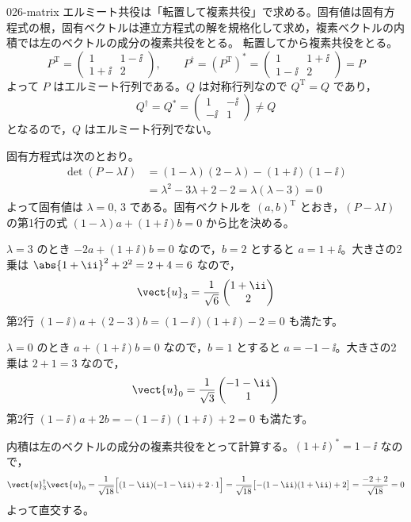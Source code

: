 \documentclass[uplatex,dvipdfmx,a4paper,11pt]{jsarticle}
\begin{document}
\kaitouhen
{}
\begin{kaisetsu}{026-matrix}
\houshin エルミート共役は「転置して複素共役」で求める。固有値は固有方程式の根，固有ベクトルは連立方程式の解を規格化して求め，複素ベクトルの内積では左のベクトルの成分の複素共役をとる。
\keisan {} 転置してから複素共役をとる。
\[ P^{\mathrm{T}}=\begin{pmatrix}1 & 1-\ii\\ 1+\ii & 2\end{pmatrix},\qquad P^{\dagger}=(P^{\mathrm{T}})^{*}=\begin{pmatrix}1 & 1+\ii\\ 1-\ii & 2\end{pmatrix}=P \]
よって $P$ はエルミート行列である。$Q$ は対称行列なので $Q^{\mathrm{T}}=Q$ であり，
\[ Q^{\dagger}=Q^{*}=\begin{pmatrix}1 & -\ii\\ -\ii & 1\end{pmatrix}\neq Q \]
となるので，$Q$ はエルミート行列でない。

 固有方程式は次のとおり。
\begin{align*}
\det(P-\lambda I)&=(1-\lambda)(2-\lambda)-(1+\ii)(1-\ii)\\
&=\lambda^{2}-3\lambda+2-2=\lambda(\lambda-3)=0
\end{align*}
よって固有値は $\lambda=0,\,3$ である。固有ベクトルを $(a,b)^{\mathrm{T}}$ とおき，$(P-\lambda I)$ の第1行の式 $(1-\lambda)a+(1+\ii)b=0$ から比を決める。

$\lambda=3$ のとき $-2a+(1+\ii)b=0$ なので，$b=2$ とすると $a=1+\ii$。大きさの2乗は $\abs{1+\ii}^{2}+2^{2}=2+4=6$ なので，
\[ \vect{u}_{3}=\frac{1}{\sqrt{6}}\begin{pmatrix}1+\ii\\ 2\end{pmatrix} \]
第2行 $(1-\ii)a+(2-3)b=(1-\ii)(1+\ii)-2=0$ も満たす。

$\lambda=0$ のとき $a+(1+\ii)b=0$ なので，$b=1$ とすると $a=-1-\ii$。大きさの2乗は $2+1=3$ なので，
\[ \vect{u}_{0}=\frac{1}{\sqrt{3}}\begin{pmatrix}-1-\ii\\ 1\end{pmatrix} \]
第2行 $(1-\ii)a+2b=-(1-\ii)(1+\ii)+2=0$ も満たす。

 内積は左のベクトルの成分の複素共役をとって計算する。$(1+\ii)^{*}=1-\ii$ なので，
\[ \vect{u}_{3}^{\dagger}\vect{u}_{0}=\frac{1}{\sqrt{18}}\Bigl[(1-\ii)(-1-\ii)+2\cdot 1\Bigr]=\frac{1}{\sqrt{18}}\bigl[-(1-\ii)(1+\ii)+2\bigr]=\frac{-2+2}{\sqrt{18}}=0 \]
よって直交する。


\end{kaisetsu}
\end{document}
